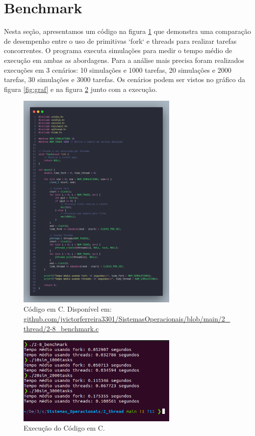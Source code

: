 \documentclass[
	12pt,				%
	openright,			%
	oneside,			%
	a4paper,			%
	chapter=TITLE,		%
	english,			%
	french,				%
	spanish,			%
	brazil				%
	]{abntex2}
\theoremstyle{definition}
\begin{document}
\section{Benchmark}

Nesta seção, apresentamos um código na figura \ref{fig:proc8} que demonstra uma comparação 
de desempenho entre o uso de primitivas `fork` e threads para realizar tarefas 
concorrentes. O programa executa simulações para medir o tempo médio de 
execução em ambas as abordagens. Para a análise mais precisa foram realizados
execuções em 3 cenários: 10 simulações e 1000 tarefas, 20 simulações e 2000 tarefas,
30 simulações e 3000 tarefas. Os cenários podem ser vistos no gráfico da figura \ref{fig:graf}
e na figura \ref{fig:run8} junto com a execução.

\begin{figure}
    \centering
    \includegraphics[width=0.7\textwidth]{imagens/processos_8.png}
    \caption{Código em C. Disponível em: \href{https://github.com/jvictorferreira3301/Sistemas_Operacionais/blob/main/2_thread/2-8_benchmark.c}{github.com/jvictorferreira3301/SistemasOperacionais/blob/main/2\_thread/2-8\_benchmark.c}}
    \label{fig:proc8}
\end{figure}

\begin{figure}
    \centering
    \includegraphics[width=0.7\textwidth]{imagens/run_processos_8.png}
    \caption{Execução do Código em C.}
    \label{fig:run8}
\end{figure}
\end{document}
